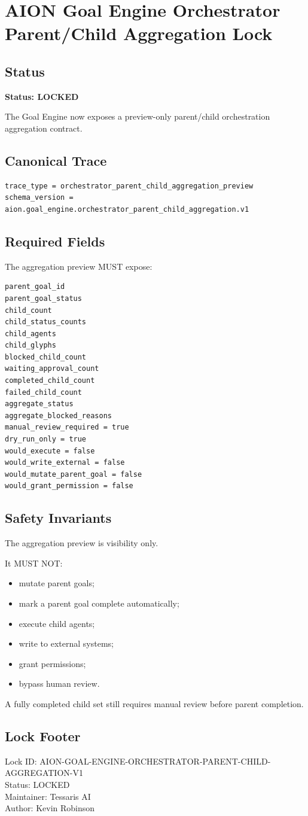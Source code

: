 \section{AION Goal Engine Orchestrator Parent/Child Aggregation Lock}
\label{sec:aion-goal-engine-orchestrator-parent-child-aggregation-lock}

\subsection{Status}

\textbf{Status: LOCKED}

The Goal Engine now exposes a preview-only parent/child orchestration aggregation contract.

\subsection{Canonical Trace}

\begin{verbatim}
trace_type = orchestrator_parent_child_aggregation_preview
schema_version = aion.goal_engine.orchestrator_parent_child_aggregation.v1
\end{verbatim}

\subsection{Required Fields}

The aggregation preview MUST expose:

\begin{verbatim}
parent_goal_id
parent_goal_status
child_count
child_status_counts
child_agents
child_glyphs
blocked_child_count
waiting_approval_count
completed_child_count
failed_child_count
aggregate_status
aggregate_blocked_reasons
manual_review_required = true
dry_run_only = true
would_execute = false
would_write_external = false
would_mutate_parent_goal = false
would_grant_permission = false
\end{verbatim}

\subsection{Safety Invariants}

The aggregation preview is visibility only.

It MUST NOT:
\begin{itemize}
  \item mutate parent goals;
  \item mark a parent goal complete automatically;
  \item execute child agents;
  \item write to external systems;
  \item grant permissions;
  \item bypass human review.
\end{itemize}

A fully completed child set still requires manual review before parent completion.

\subsection{Lock Footer}

Lock ID: AION-GOAL-ENGINE-ORCHESTRATOR-PARENT-CHILD-AGGREGATION-V1\\
Status: LOCKED\\
Maintainer: Tessaris AI\\
Author: Kevin Robinson
